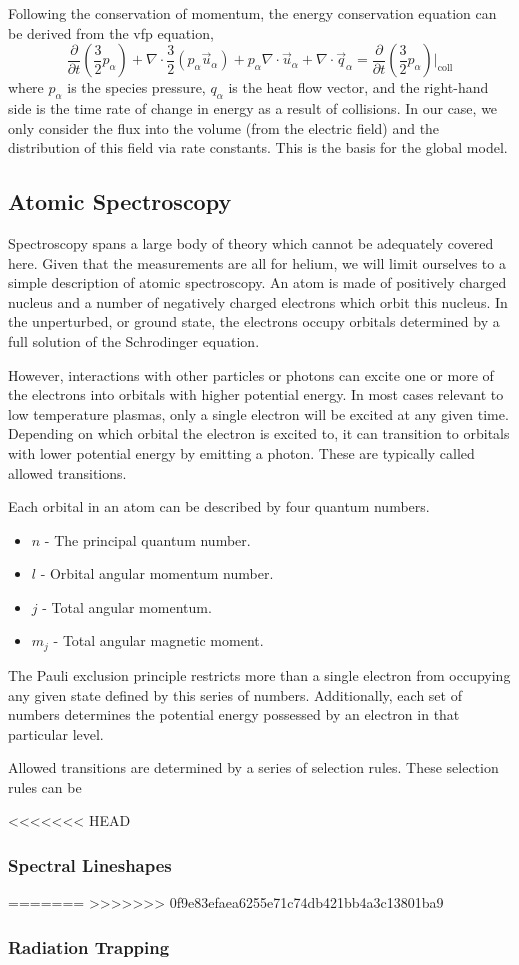 Following the conservation of momentum, the energy conservation equation
can be derived from the \acs{vfp} equation,
\begin{equation}
  \frac{\partial}{\partial t}\left(\frac{3}{2}p_\alpha\right) 
  + \nabla\cdot\frac{3}{2} (p_\alpha\vec{u}_\alpha)
  + p_\alpha\nabla\cdot\vec{u}_\alpha
  + \nabla\cdot\vec{q}_\alpha
  = \frac{\partial}{\partial
  t}\left(\frac{3}{2}p_\alpha\right)\bigg|_\mathrm{coll}
\end{equation}
where $p_\alpha$ is the species pressure, $q_\alpha$ is the heat flow
vector, and the right-hand side is the time rate of change in energy as
a result of collisions. In our case, we only consider the flux into the
volume (from the electric field) and the distribution of this field via
rate constants. This is the basis for the global model.

\subsection{Atomic Spectroscopy}

Spectroscopy spans a large body of theory which cannot be adequately
covered here. Given that the measurements are all for helium, we will
limit ourselves to a simple description of atomic spectroscopy. An atom
is made of positively charged nucleus and a number of negatively charged
electrons which orbit this nucleus. In the unperturbed, or ground state,
the electrons occupy orbitals determined by a full solution of the
Schrodinger equation.

However, interactions with other particles or photons can excite one or
more of the electrons into orbitals with higher potential energy. In
most cases relevant to low temperature plasmas, only a single electron
will be excited at any given time. Depending on which orbital the
electron is excited to, it can transition to orbitals with lower
potential energy by emitting a photon. These are typically called
allowed transitions.

Each orbital in an atom can be described by four quantum numbers.
\begin{itemize}
  \item $n$ - The principal quantum number.
  \item $l$ - Orbital angular momentum number.
  \item $j$ - Total angular momentum.
  \item $m_j$ - Total angular magnetic moment.
\end{itemize}
The Pauli exclusion principle restricts more than a single electron from
occupying any given state defined by this series of numbers.
Additionally, each set of numbers determines the potential energy
possessed by an electron in that particular level. 

Allowed transitions are determined by a series of selection rules. These
selection rules can be 

<<<<<<< HEAD
\subsubsection{Spectral Lineshapes}

=======
>>>>>>> 0f9e83efaea6255e71c74db421bb4a3c13801ba9
\subsubsection{Radiation Trapping}
